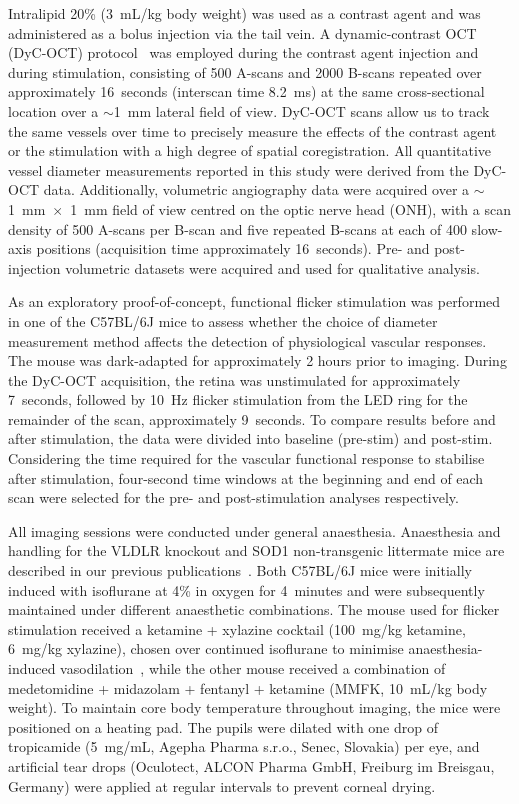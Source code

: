 Intralipid 20\% (3~mL/kg body weight) was used as a contrast agent and was administered as a bolus injection via the tail vein. A dynamic-contrast OCT (DyC-OCT) protocol~\cite{merkleLaminarMicrovascularTransit2016} was employed during the contrast agent injection and during stimulation, consisting of 500 A-scans and 2000 B-scans repeated over approximately 16~seconds (interscan time 8.2~ms) at the same cross-sectional location over a $\sim$1~mm lateral field of view. DyC-OCT scans allow us to track the same vessels over time to precisely measure the effects of the contrast agent or the stimulation with a high degree of spatial coregistration. All quantitative vessel diameter measurements reported in this study were derived from the DyC-OCT data. Additionally, volumetric angiography data were acquired over a $\sim$1~mm~$\times$~1~mm field of view centred on the optic nerve head (ONH), with a scan density of 500 A-scans per B-scan and five repeated B-scans at each of 400 slow-axis positions (acquisition time approximately 16~seconds). Pre- and post-injection volumetric datasets were acquired and used for qualitative analysis.

As an exploratory proof-of-concept, functional flicker stimulation was performed in one of the C57BL/6J mice to assess whether the choice of diameter measurement method affects the detection of physiological vascular responses. The mouse was dark-adapted for approximately 2 hours prior to imaging. During the DyC-OCT acquisition, the retina was unstimulated for approximately 7~seconds, followed by 10~Hz flicker stimulation from the LED ring for the remainder of the scan, approximately 9~seconds. To compare results before and after stimulation, the data were divided into baseline (pre-stim) and post-stim. Considering the time required for the vascular functional response to stabilise after stimulation, four-second time windows at the beginning and end of each scan were selected for the pre- and post-stimulation analyses respectively.

All imaging sessions were conducted under general anaesthesia. Anaesthesia and handling for the VLDLR knockout and SOD1 non-transgenic littermate mice are described in our previous publications~\cite{augustinMultifunctionalOCTEnables2016,augustinOpticalCoherenceTomography2020}. Both C57BL/6J mice were initially induced with isoflurane at 4\% in oxygen for 4~minutes and were subsequently maintained under different anaesthetic combinations. The mouse used for flicker stimulation received a ketamine + xylazine cocktail (100~mg/kg ketamine, 6~mg/kg xylazine), chosen over continued isoflurane to minimise anaesthesia-induced vasodilation~\cite{sullenderDynamicsIsofluraneInduced2022,wormRetinalOCTParameters2026}, while the other mouse received a combination of medetomidine + midazolam + fentanyl + ketamine (MMFK, 10~mL/kg body weight). To maintain core body temperature throughout imaging, the mice were positioned on a heating pad. The pupils were dilated with one drop of tropicamide (5~mg/mL, Agepha Pharma s.r.o., Senec, Slovakia) per eye, and artificial tear drops (Oculotect, ALCON Pharma GmbH, Freiburg im Breisgau, Germany) were applied at regular intervals to prevent corneal drying.

